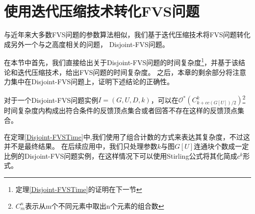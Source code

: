 \section{使用迭代压缩技术转化FVS问题}
与近年来大多数FVS问题的参数算法相似，我们基于迭代压缩技术将FVS问题转化成另外一个与之高度相关的问题，
Disjoint-FVS问题。

在本节中首先，我们直接给出关于Disjoint-FVS问题的时间复杂度\footnote{定理\ref{Disjoint-FVSTime}的证明在下一节}，并基于该结论和迭代压缩技术，给出FVS问题的时间复杂度。
之后，本章的剩余部分将注意力集中在Disjoint-FVS问题上，证明下述结论的正确性。
\begin{theorem} \label{Disjoint-FVSTime}
  对于一个Disjoint-FVS问题实例$I = (G, U, D, k)$，可以在$\mathcal{O}^*(C^k_{k + cc(G[U])/2})$\footnote{$C^n_m$表示从m个不同元素中取出n个元素的组合数}时间复杂度内构成出符合条件的反馈顶点集合或者回答不存在这样的反馈顶点集合。
\end{theorem}

在定理\ref{Disjoint-FVSTime}中,我们使用了组合计数的方式来表达其复杂度，不过这并不是最终结果。
在后续应用中，我们只处理参数$k$与图$G[U]$连通块个数成一定比例的Disjoint-FVS问题实例，在这样情况下可以使用Stirling公式将其化简成$c^k$形式。

